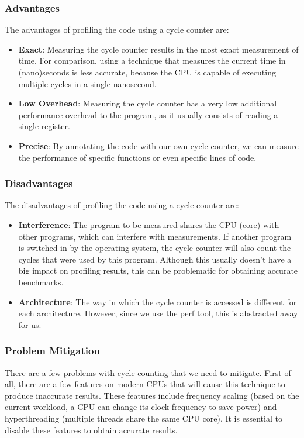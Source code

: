 \documentclass[11pt,a4paper]{report}
\begin{document}
\subsubsection{Advantages}
The advantages of profiling the code using a cycle counter are:
\begin{itemize}
  \item \textbf{Exact}: Measuring the cycle counter results in the most exact measurement of time. For comparison, using a technique that measures the current time in (nano)seconds is less accurate, because the CPU is capable of executing multiple cycles in a single nanosecond.
  \item \textbf{Low Overhead}: Measuring the cycle counter has a very low additional performance overhead to the program, as it usually consists of reading a single register.
  \item \textbf{Precise}: By annotating the code with our own cycle counter, we can measure the performance of specific functions or even specific lines of code.
\end{itemize}

\subsubsection{Disadvantages}
The disadvantages of profiling the code using a cycle counter are:
\begin{itemize}
  \item \textbf{Interference}: The program to be measured shares the CPU (core) with other programs, which can interfere with measurements. If another program is switched in by the operating system, the cycle counter will also count the cycles that were used by this program. Although this usually doesn't have a big impact on profiling results, this can be problematic for obtaining accurate benchmarks.
  \item \textbf{Architecture}: The way in which the cycle counter is accessed is different for each architecture. However, since we use the perf tool, this is abstracted away for us.
\end{itemize}

\subsubsection{Problem Mitigation}
There are a few problems with cycle counting that we need to mitigate. First of all, there are a few features on modern CPUs that will cause this technique to produce inaccurate results. These features include frequency scaling (based on the current workload, a CPU can change its clock frequency to save power) and hyperthreading (multiple threads share the same CPU core). It is essential to disable these features to obtain accurate results.
\end{document}
